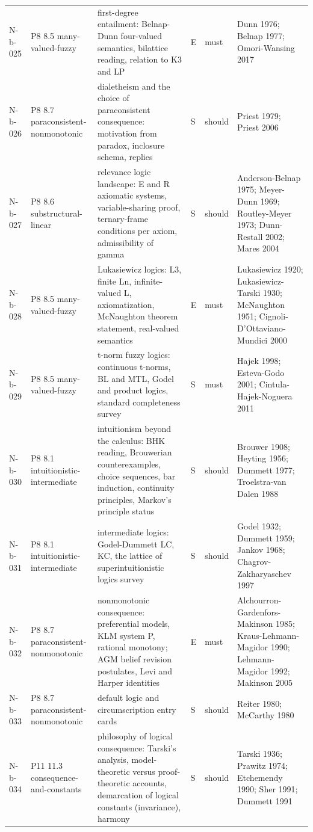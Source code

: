 \begin{longtable}{@{}p{0.52in}p{0.85in}p{2.5in}p{0.22in}p{0.42in}p{1.95in}@{}}
N-b-025 & P8 8.5 many-valued-fuzzy & first-degree entailment: Belnap-Dunn four-valued semantics, bilattice reading, relation to K3 and LP & E & must & Dunn 1976; Belnap 1977; Omori-Wansing 2017 \\
N-b-026 & P8 8.7 paraconsistent-nonmonotonic & dialetheism and the choice of paraconsistent consequence: motivation from paradox, inclosure schema, replies & S & should & Priest 1979; Priest 2006 \\
N-b-027 & P8 8.6 substructural-linear & relevance logic landscape: E and R axiomatic systems, variable-sharing proof, ternary-frame conditions per axiom, admissibility of gamma & S & should & Anderson-Belnap 1975; Meyer-Dunn 1969; Routley-Meyer 1973; Dunn-Restall 2002; Mares 2004 \\
N-b-028 & P8 8.5 many-valued-fuzzy & Lukasiewicz logics: L3, finite Ln, infinite-valued L, axiomatization, McNaughton theorem statement, real-valued semantics & E & must & Lukasiewicz 1920; Lukasiewicz-Tarski 1930; McNaughton 1951; Cignoli-D'Ottaviano-Mundici 2000 \\
N-b-029 & P8 8.5 many-valued-fuzzy & t-norm fuzzy logics: continuous t-norms, BL and MTL, Godel and product logics, standard completeness survey & S & must & Hajek 1998; Esteva-Godo 2001; Cintula-Hajek-Noguera 2011 \\
N-b-030 & P8 8.1 intuitionistic-intermediate & intuitionism beyond the calculus: BHK reading, Brouwerian counterexamples, choice sequences, bar induction, continuity principles, Markov's principle status & S & should & Brouwer 1908; Heyting 1956; Dummett 1977; Troelstra-van Dalen 1988 \\
N-b-031 & P8 8.1 intuitionistic-intermediate & intermediate logics: Godel-Dummett LC, KC, the lattice of superintuitionistic logics survey & S & should & Godel 1932; Dummett 1959; Jankov 1968; Chagrov-Zakharyaschev 1997 \\
N-b-032 & P8 8.7 paraconsistent-nonmonotonic & nonmonotonic consequence: preferential models, KLM system P, rational monotony; AGM belief revision postulates, Levi and Harper identities & E & must & Alchourron-Gardenfors-Makinson 1985; Kraus-Lehmann-Magidor 1990; Lehmann-Magidor 1992; Makinson 2005 \\
N-b-033 & P8 8.7 paraconsistent-nonmonotonic & default logic and circumscription entry cards & S & should & Reiter 1980; McCarthy 1980 \\
N-b-034 & P11 11.3 consequence-and-constants & philosophy of logical consequence: Tarski's analysis, model-theoretic versus proof-theoretic accounts, demarcation of logical constants (invariance), harmony & S & should & Tarski 1936; Prawitz 1974; Etchemendy 1990; Sher 1991; Dummett 1991 \\

\end{longtable}
